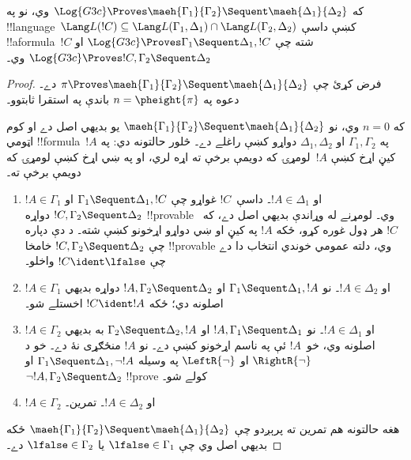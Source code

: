 \documentclass[../../../include/open-logic-section]{subfiles}
\begin{document}
\begin{lem}
که $\Log{G3c}
\Proves \maeh{\Gamma_1}{\Gamma_2} \Sequent \maeh{\Delta_1}{\Delta_2}$
وي، نو په !!{language}~$\Lang L(!C)
\subseteq \Lang L(\Gamma_1,
\Delta_1) \cap \Lang L(\Gamma_2, \Delta_2)$ کښې داسې !!a{formula}~$!C$
شته چې $\Log{G3c}
\Proves \Gamma_1 \Sequent \Delta_1, !C$ او $\Log{G3c} \Proves !C,
\Gamma_2 \Sequent \Delta_2$ وي۔
\end{lem}

\begin{proof}
  فرض کړئ چې $\pi \Proves \maeh{\Gamma_1}{\Gamma_2} \Sequent
  \maeh{\Delta_1}{\Delta_2}$ دے۔ دعوه په
  $n=\pheight{\pi}$ باندې په استقرا ثابتوو۔

  که $n=0$ وي، نو $\maeh{\Gamma_1}{\Gamma_2} \Sequent
  \maeh{\Delta_1}{\Delta_2}$ يو بديهي اصل دے او کوم اټومي
  !!{formula}~$!A$ په $\Gamma_1, \Gamma_2$ او $\Delta_1,
  \Delta_2$ دواړو کښې راغلے دے۔ څلور حالتونه دي: په کيڼ اړخ
  کښې $!A$~لومړۍ که دويمې برخې ته اړه لري، او په ښي اړخ کښې
  لومړۍ که دويمې برخې ته۔
  \begin{enumerate}
    \item $!A \in \Gamma_1$ او $!A \in \Delta_1$۔ داسې~$!C$
    غواړو چې $\Gamma_1 \Sequent \Delta_1, !C$ او $!C, \Gamma_2
    \Sequent \Delta_2$ دواړه !!{provable} وي۔ لومړنے له وړاندې
    بديهي اصل دے، که~$!C$ هر ډول غوره کړو، ځکه $!A$ په کيڼ او ښي
    دواړو اړخونو کښې شته۔ د دې دپاره چې $!C, \Gamma_2
    \Sequent \Delta_2$ خامخا !!{provable} وي، دلته عمومي خوندي
    انتخاب دا دے چې $!C \ident \lfalse$ واخلو۔
    \item $!A \in \Gamma_1$ او $!A \in \Delta_2$۔ نو $\Gamma_1
    \Sequent \Delta_1, !A$ او $!A, \Gamma_2 \Sequent \Delta_2$
    دواړه بديهي اصلونه دي؛ ځکه $!C \ident !A$ اخستلے شو۔
    \item $!A \in \Gamma_2$ او $!A \in \Delta_1$۔ نو $!A, \Gamma_1
    \Sequent \Delta_1$ او $\Gamma_2 \Sequent \Delta_2, !A$ به
    بديهي اصلونه وي، خو~$!A$ ئې په ناسم اړخونو کښې دے۔ نو $!A$
    منځګړی نۀ دے۔ خو د $\RightR{\lnot}$ او $\LeftR{\lnot}$ په
    وسيله $\Gamma_1
    \Sequent \Delta_1, \lnot!A$ او $\lnot !A, \Gamma_2 \Sequent
    \Delta_2$ !!{prove} کولے شو۔
    \item $!A \in \Gamma_2$ او $!A \in \Delta_2$۔ تمرين۔
  \end{enumerate}
  هغه حالتونه هم تمرين ته پرېږدو چې $\maeh{\Gamma_1}{\Gamma_2} \Sequent
  \maeh{\Delta_1}{\Delta_2}$ ځکه بديهي اصل وي چې $\lfalse \in
  \Gamma_1$ يا $\lfalse \in \Gamma_2$ دے۔


\end{proof}
\end{document}
